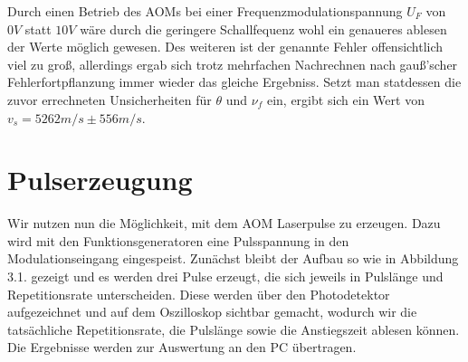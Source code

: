 \documentclass[bigchapter,colorback,accentcolor=tud4b,linedtoc,11pt]{tudreport}
\begin{document}
Durch einen Betrieb des AOMs bei einer Frequenzmodulationspannung $U_F$ von $0V$ statt $10V$ wäre durch die geringere Schallfequenz wohl ein genaueres ablesen der Werte möglich gewesen. Des weiteren ist der genannte Fehler offensichtlich viel zu groß, allerdings ergab sich trotz mehrfachen Nachrechnen nach gauß'scher Fehlerfortpflanzung immer wieder das gleiche Ergebniss. Setzt man statdessen die zuvor errechneten Unsicherheiten für $\theta$ und $\nu_f$ ein, ergibt sich ein Wert von $v_s = 5262m/s \pm 556m/s$.

\section{Pulserzeugung}

Wir nutzen nun die Möglichkeit, mit dem AOM Laserpulse zu erzeugen. Dazu wird mit den Funktionsgeneratoren eine Pulsspannung in den Modulationseingang eingespeist. Zunächst bleibt der Aufbau so wie in Abbildung 3.1. gezeigt und es werden drei Pulse erzeugt, die sich jeweils in Pulslänge und Repetitionsrate unterscheiden. Diese werden über den Photodetektor aufgezeichnet und auf dem Oszilloskop sichtbar gemacht, wodurch wir die tatsächliche Repetitionsrate, die Pulslänge sowie die Anstiegszeit ablesen können. Die Ergebnisse werden zur Auswertung an den PC übertragen.
\end{document}
